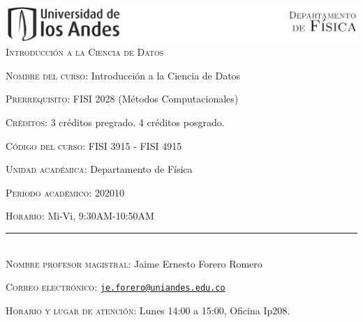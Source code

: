 \documentclass[letterpaper,10pt,onecolumn]{article}
\begin{document}
\begin{center}

\includegraphics[width=490pt]{header.png}\\[0.5cm]

\textsc{\LARGE Introducci\'on a la Ciencia de Datos}\\[0.1cm]

\end{center}

\large \noindent\textsc{Nombre del curso:}  Introducci\'on a la Ciencia de Datos%
  
\noindent\textsc{Prerrequisito:} FISI 2028 (M\'etodos Computacionales)%

\noindent\textsc{Cr\'editos:} 3 cr\'editos pregrado. 4 cr\'editos posgrado. %

\noindent\textsc{C\'odigo del curso:} FISI 3915 - FISI 4915 %

\noindent\textsc{Unidad acad\'emica:} Departamento de F\'isica

\noindent\textsc{Periodo acad\'emico:} 202010 %

\noindent\textsc{Horario:} Mi-Vi, 9:30AM-10:50AM



\noindent\rule{\textwidth}{1pt}\\[-0.3cm]

\normalsize \noindent\textsc{Nombre profesor magistral:}
Jaime Ernesto Forero Romero%

\noindent\textsc{Correo electr\'onico:}
\href{mailto:je.forero@uniandes.edu.co}{\nolinkurl{je.forero@uniandes.edu.co}}

\noindent\textsc{Horario y lugar de atenci\'on:}  Lunes 14:00 a 15:00, Oficina Ip208.

\end{document}
